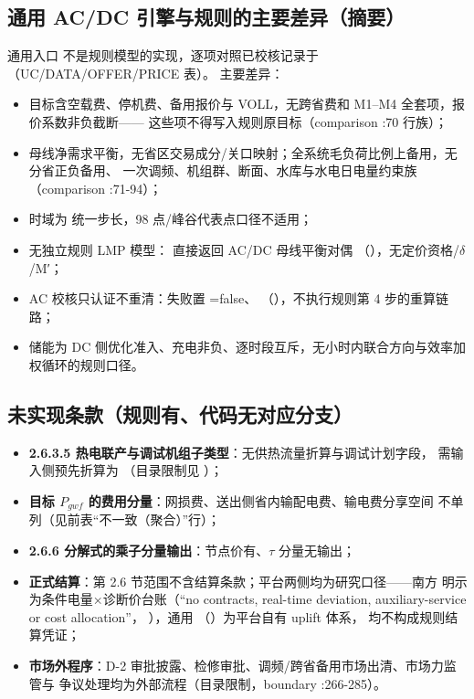 \subsection{通用 AC/DC 引擎与规则的主要差异（摘要）}
通用入口  不是规则模型的实现，逐项对照已校核记录于
（UC/DATA/OFFER/PRICE 表）。
主要差异：
\begin{itemize}
  \item 目标含空载费、停机费、备用报价与 VOLL，无跨省费和 M1--M4 全套项，报价系数非负截断——
        这些项不得写入规则原目标（comparison :70 行族）；
  \item 母线净需求平衡，无省区交易成分/关口映射；全系统毛负荷比例上备用，无分省正负备用、
        一次调频、机组群、断面、水库与水电日电量约束族（comparison :71-94）；
  \item 时域为  统一步长，98 点/峰谷代表点口径不适用；
  \item 无独立规则 LMP 模型： 直接返回 AC/DC 母线平衡对偶
        （），无定价资格/$\delta$/M′；
  \item AC 校核只认证不重清：失败置 =false、
        （），不执行规则第 4 步的重算链路；
  \item 储能为 DC 侧优化准入、充电非负、逐时段互斥，无小时内联合方向与效率加权循环的规则口径。
\end{itemize}

\subsection{未实现条款（规则有、代码无对应分支）}
\begin{itemize}
  \item \textbf{2.6.3.5 热电联产与调试机组子类型}：无供热流量折算与调试计划字段，
        需输入侧预先折算为 （目录限制见
        ）；
  \item \textbf{目标 $P_{gwf}$ 的费用分量}：网损费、送出侧省内输配电费、输电费分享空间
        不单列（见前表“不一致（聚合）”行）；
  \item \textbf{2.6.6 分解式的乘子分量输出}：节点价有、$\tau$ 分量无输出；
  \item \textbf{正式结算}：第 2.6 节范围不含结算条款；平台两侧均为研究口径——南方
         明示为条件电量×诊断价台账（“no contracts,
        real-time deviation, auxiliary-service or cost allocation”，
        ），通用 
        （）为平台自有 uplift 体系，
        均不构成规则结算凭证；
  \item \textbf{市场外程序}：D-2 审批披露、检修审批、调频/跨省备用市场出清、市场力监管与
        争议处理均为外部流程（目录限制，boundary :266-285）。
\end{itemize}

